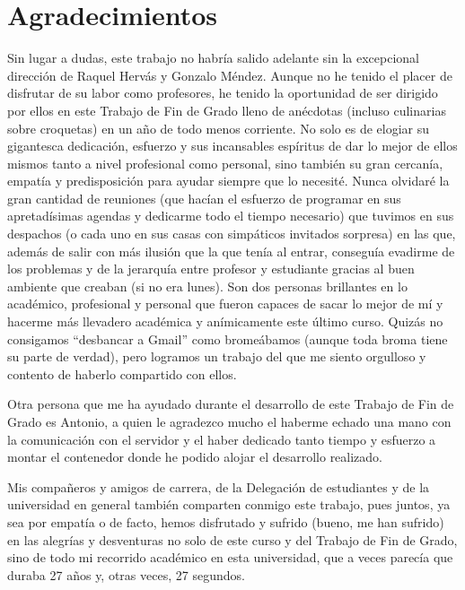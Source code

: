 
\chapter*{Agradecimientos}

Sin lugar a dudas, este trabajo no habría salido adelante sin la excepcional dirección de Raquel Hervás y Gonzalo Méndez. Aunque no he tenido el placer de disfrutar de su labor como profesores, he tenido la oportunidad de ser dirigido por ellos en este Trabajo de Fin de Grado lleno de anécdotas (incluso culinarias sobre croquetas) en un año de todo menos corriente. No solo es de elogiar su gigantesca dedicación, esfuerzo y sus incansables espíritus de dar lo mejor de ellos mismos tanto a nivel profesional como personal, sino también su gran cercanía, empatía y predisposición para ayudar siempre que lo necesité. Nunca olvidaré la gran cantidad de reuniones (que hacían el esfuerzo de programar en sus apretadísimas agendas y dedicarme todo el tiempo necesario) que tuvimos en sus despachos (o cada uno en sus casas con simpáticos invitados sorpresa) en las que, además de salir con más ilusión que la que tenía al entrar, conseguía evadirme de los problemas y de la jerarquía entre profesor y estudiante gracias al buen ambiente que creaban (si no era lunes). Son dos personas brillantes en lo académico, profesional y personal que fueron capaces de sacar lo mejor de mí y hacerme más llevadero académica y anímicamente este último curso. Quizás no consigamos ``desbancar a Gmail'' como bromeábamos (aunque toda broma tiene su parte de verdad), pero logramos un trabajo del que me siento orgulloso y contento de haberlo compartido con ellos.

Otra persona que me ha ayudado durante el desarrollo de este Trabajo de Fin de Grado es Antonio, a quien le agradezco mucho el haberme echado una mano con la comunicación con el servidor y el haber dedicado tanto tiempo y esfuerzo a montar el contenedor donde he podido alojar el desarrollo realizado.

Mis compañeros y amigos de carrera, de la Delegación de estudiantes y de la universidad en general también comparten conmigo este trabajo, pues juntos, ya sea por empatía o de facto, hemos disfrutado y sufrido (bueno, me han sufrido) en las alegrías y desventuras no solo de este curso y del Trabajo de Fin de Grado, sino de todo mi recorrido académico en esta universidad, que a veces parecía que duraba 27 años y, otras veces, 27 segundos.

